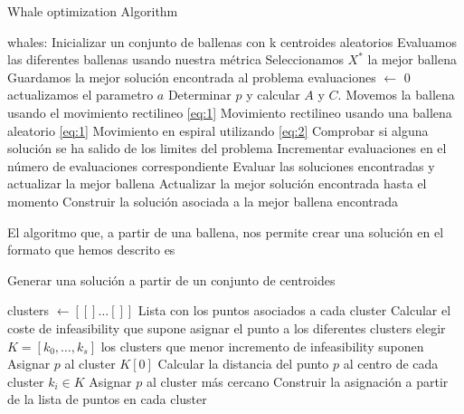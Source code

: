 \documentclass[11pt]{article}
\begin{document}
\begin{algorithm}[H]
  \caption{Whale optimization Algorithm}
  \label{alg-lsearch}
  \begin{algorithmic}[1]
    \State whales: Inicializar un conjunto de ballenas con k centroides aleatorios
    \State Evaluamos las diferentes ballenas usando nuestra métrica 
    \State Seleccionamos $X^*$ la mejor ballena
    \State Guardamos la mejor solución encontrada al problema
    \State evaluaciones $\leftarrow$ 0
    \State actualizamos el parametro $a$
    \State Determinar $p$ y calcular  $A$ y $C$.
    \State Movemos la ballena usando el movimiento rectilineo \eqref{eq:1}
    \State Movimiento rectilineo usando una ballena aleatorio \eqref{eq:1}
    \EndIf
    \Else
    \State Movimiento en espiral utilizando \eqref{eq:2}
    \EndIf
    \EndFor 
    \State Comprobar si alguna solución se ha salido de los limites del problema
    \State Incrementar evaluaciones en el número de evaluaciones correspondiente
    \State Evaluar las soluciones encontradas y actualizar la mejor ballena 
    \State Actualizar la mejor solución encontrada hasta el momento
    \EndIf
    \EndWhile
    \State
    \Return Construir la solución asociada a la mejor ballena encontrada
    \EndProcedure
  \end{algorithmic}
\end{algorithm}

El algoritmo que, a partir de una ballena, nos permite crear una solución en el
formato que hemos descrito es 


\begin{algorithm}[H]
  \caption{Generar una solución a partir de un conjunto de centroides}
  \label{alg-lsearch}
  \begin{algorithmic}[1]
    \State clusters $\leftarrow [[]\dots[]]$  Lista con los puntos asociados a cada cluster
    \State Calcular el coste de infeasibility que supone asignar el punto a los diferentes clusters 
    \State elegir $K = [k_0,\dots,k_s]$ los clusters que menor incremento de infeasibility suponen
    \State Asignar $p$ al cluster $K[0]$
    \Else
    \State Calcular la distancia del punto $p$ al centro de cada cluster $k_i \in K$
    \State Asignar $p$ al cluster más cercano
    \EndIf
    \EndFor
    \State
    \Return Construir la asignación a partir de la lista de puntos en cada cluster
    \EndProcedure
  \end{algorithmic}
\end{algorithm}
\end{document}
